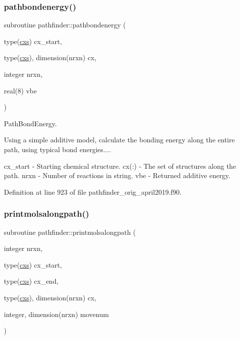 \subsubsection{\texorpdfstring{pathbondenergy()}{pathbondenergy()}\hspace{0.1cm}{\footnotesize\ttfamily [2/3]}}
{\footnotesize\ttfamily subroutine pathfinder\+::pathbondenergy (\begin{DoxyParamCaption}\item[{type(\mbox{\hyperlink{structchemstr_1_1cxs}{cxs}})}]{cx\+\_\+start,  }\item[{type(\mbox{\hyperlink{structchemstr_1_1cxs}{cxs}}), dimension(nrxn)}]{cx,  }\item[{integer}]{nrxn,  }\item[{real(8)}]{vbe }\end{DoxyParamCaption})}



Path\+Bond\+Energy. 

Using a simple additive model, calculate the bonding energy along the entire path, using typical bond energies....

cx\+\_\+start -\/ Starting chemical structure. cx(\+:) -\/ The set of structures along the path. nrxn -\/ Number of reactions in string. vbe -\/ Returned additive energy. 

Definition at line 923 of file pathfinder\+\_\+orig\+\_\+april2019.\+f90.

\mbox{\label{namespacepathfinder_a571d6f1c2ef923b3f058c761f8b2080c}} 
\subsubsection{\texorpdfstring{printmolsalongpath()}{printmolsalongpath()}\hspace{0.1cm}{\footnotesize\ttfamily [2/2]}}
{\footnotesize\ttfamily subroutine pathfinder\+::printmolsalongpath (\begin{DoxyParamCaption}\item[{integer}]{nrxn,  }\item[{type(\mbox{\hyperlink{structchemstr_1_1cxs}{cxs}})}]{cx\+\_\+start,  }\item[{type(\mbox{\hyperlink{structchemstr_1_1cxs}{cxs}})}]{cx\+\_\+end,  }\item[{type(\mbox{\hyperlink{structchemstr_1_1cxs}{cxs}}), dimension(nrxn)}]{cx,  }\item[{integer, dimension(nrxn)}]{movenum }\end{DoxyParamCaption})}



